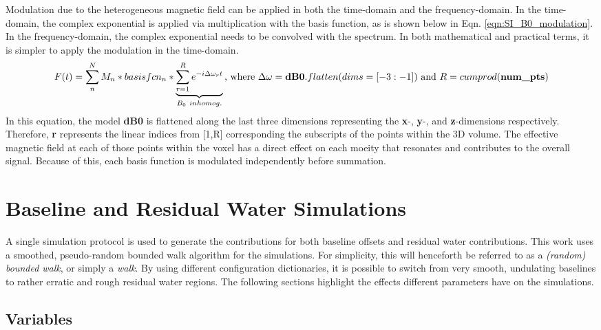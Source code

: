 \documentclass[AMA,LATO1COL]{WileyNJD-v2}
\begin{document}
Modulation due to the heterogeneous magnetic field can be applied in both the time-domain and the frequency-domain. In the time-domain, the complex exponential is applied via multiplication with the basis function, as is shown below in Eqn. \ref{eqn:SI_B0_modulation}. In the frequency-domain, the complex exponential needs to be convolved with the spectrum. In both mathematical and practical terms, it is simpler to apply the modulation in the time-domain.
\begin{equation}\label{eqn:SI_B0_modulation}
    F(t) = \sum_n^N M_n * basisfcn_n * \underbrace{ \sum_{r=1}^R e^{-i\Delta\omega_r t} }_{B_0\ inhomog.} \textnormal{, where }
    \Delta\omega = \mathbf{dB0}.flatten(dims=[-3:-1]) \textnormal{ and } R=cumprod(\textbf{num\_pts})
\end{equation}
In this equation, the model \textbf{dB0} is flattened along the last three dimensions representing the \textbf{x}-, \textbf{y}-, and \textbf{z}-dimensions respectively. Therefore, \textbf{r} represents the linear indices from [1,R] corresponding the subscripts of the points within the 3D volume. The effective magnetic field at each of those points within the voxel has a direct effect on each moeity that resonates and contributes to the overall signal. Because of this, each basis function is modulated independently before summation. 


\newpage
\section{Baseline and Residual Water Simulations}\label{baseline-simulations}
A single simulation protocol is used to generate the contributions for both baseline offsets and residual water contributions. This work uses a smoothed, pseudo-random bounded walk algorithm for the simulations. For simplicity, this will henceforth be referred to as a \emph{(random) bounded walk}, or simply a \emph{walk}. By using different configuration dictionaries, it is possible to switch from very smooth, undulating baselines to rather erratic and rough residual water regions. The following sections highlight the effects different parameters have on the simulations. 

\subsection{Variables}\label{variables}
\end{document}
